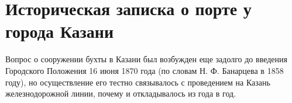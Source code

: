 \documentclass[]{article}
\title{}
\author{}
\begin{document}
\section*{Историческая записка о порте у города Казани}


Вопрос о сооружении бухты в Казани был возбужден еще задолго до введения Городского Положения 16 июня 1870 года (по словам Н. Ф. Банарцева в 1858 году), но осуществление его тестно связывалось с проведением на Казань железнодорожной линии, почему и откладывалось из года в год.
\end{document}
